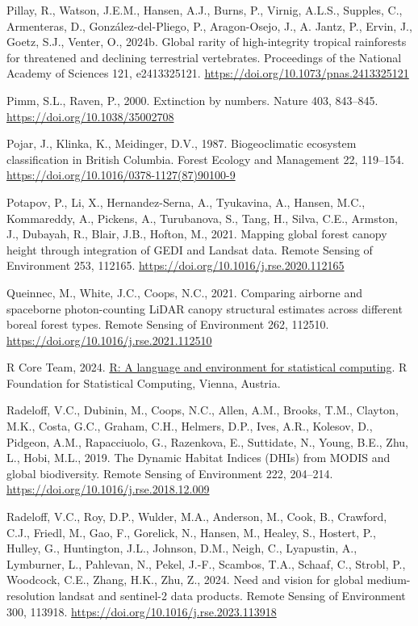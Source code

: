 \documentclass[
]{agujournal2019}
\newlength{\cslhangindent}
\newenvironment{CSLReferences}[2] %
 {\begin{list}{}{%
  \setlength{\itemindent}{0pt}
  \setlength{\leftmargin}{0pt}
  \setlength{\parsep}{0pt}
  \ifodd #1
   \setlength{\leftmargin}{\cslhangindent}
   \setlength{\itemindent}{-1\cslhangindent}
  \fi
  \setlength{\itemsep}{#2\baselineskip}}}
 {\end{list}}
\begin{document}
\begin{CSLReferences}{1}{0}
Pillay, R., Watson, J.E.M., Hansen, A.J., Burns, P., Virnig, A.L.S.,
Supples, C., Armenteras, D., González-del-Pliego, P., Aragon-Osejo, J.,
A. Jantz, P., Ervin, J., Goetz, S.J., Venter, O., 2024b. Global rarity
of high-integrity tropical rainforests for threatened and declining
terrestrial vertebrates. Proceedings of the National Academy of Sciences
121, e2413325121. \url{https://doi.org/10.1073/pnas.2413325121}

Pimm, S.L., Raven, P., 2000. Extinction by numbers. Nature 403,
843--845. \url{https://doi.org/10.1038/35002708}

Pojar, J., Klinka, K., Meidinger, D.V., 1987. Biogeoclimatic ecosystem
classification in British Columbia. Forest Ecology and Management 22,
119--154. \url{https://doi.org/10.1016/0378-1127(87)90100-9}

Potapov, P., Li, X., Hernandez-Serna, A., Tyukavina, A., Hansen, M.C.,
Kommareddy, A., Pickens, A., Turubanova, S., Tang, H., Silva, C.E.,
Armston, J., Dubayah, R., Blair, J.B., Hofton, M., 2021. Mapping global
forest canopy height through integration of GEDI and Landsat data.
Remote Sensing of Environment 253, 112165.
\url{https://doi.org/10.1016/j.rse.2020.112165}

Queinnec, M., White, J.C., Coops, N.C., 2021. Comparing airborne and
spaceborne photon-counting LiDAR canopy structural estimates across
different boreal forest types. Remote Sensing of Environment 262,
112510. \url{https://doi.org/10.1016/j.rse.2021.112510}

R Core Team, 2024. \href{https://www.R-project.org/}{R: A language and
environment for statistical computing}. R Foundation for Statistical
Computing, Vienna, Austria.

Radeloff, V.C., Dubinin, M., Coops, N.C., Allen, A.M., Brooks, T.M.,
Clayton, M.K., Costa, G.C., Graham, C.H., Helmers, D.P., Ives, A.R.,
Kolesov, D., Pidgeon, A.M., Rapacciuolo, G., Razenkova, E., Suttidate,
N., Young, B.E., Zhu, L., Hobi, M.L., 2019. The Dynamic Habitat Indices
(DHIs) from MODIS and global biodiversity. Remote Sensing of Environment
222, 204--214. \url{https://doi.org/10.1016/j.rse.2018.12.009}

Radeloff, V.C., Roy, D.P., Wulder, M.A., Anderson, M., Cook, B.,
Crawford, C.J., Friedl, M., Gao, F., Gorelick, N., Hansen, M., Healey,
S., Hostert, P., Hulley, G., Huntington, J.L., Johnson, D.M., Neigh, C.,
Lyapustin, A., Lymburner, L., Pahlevan, N., Pekel, J.-F., Scambos, T.A.,
Schaaf, C., Strobl, P., Woodcock, C.E., Zhang, H.K., Zhu, Z., 2024. Need
and vision for global medium-resolution landsat and sentinel-2 data
products. Remote Sensing of Environment 300, 113918.
\url{https://doi.org/10.1016/j.rse.2023.113918}


\end{CSLReferences}
\end{document}
